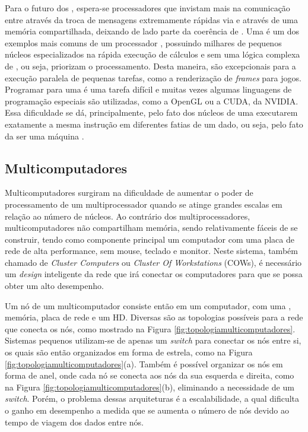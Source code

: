 Para o futuro dos \manycores, espera-se processadores que invistam mais  na comunicação entre \CPUs através da troca de mensagens extremamente rápidas via \hardware e através de uma memória compartilhada, deixando de lado parte da coerência de \cache. Uma \GPU é um dos exemplos mais comuns de um processador \manycore, possuindo milhares de pequenos núcleos especializados na rápida execução de cálculos e sem uma lógica complexa de \cache, ou seja, priorizam o processamento. Desta maneira, \GPUs são excepcionais para a execução paralela de pequenas tarefas, como a renderização de \textit{frames} para jogos. Programar para uma \GPU é uma tarefa difícil e muitas vezes algumas linguagens de programação especiais são utilizadas, como a OpenGL ou a CUDA, da NVIDIA. Essa dificuldade se dá, principalmente, pelo fato dos núcleos de uma \GPU executarem exatamente a mesma instrução em diferentes fatias de um dado, ou seja, pelo fato da \GPU ser uma máquina \textit{\SIMD}.

\subsection{Multicomputadores}
\label{sec:multicomputadores}

Multicomputadores surgiram na dificuldade de aumentar o poder de processamento de um multiprocessador quando se atinge grandes escalas em relação ao número de núcleos. Ao contrário dos multiprocessadores, multicomputadores não compartilham memória, sendo relativamente fáceis de se construir, tendo como componente principal um computador com uma placa de rede de alta performance, sem mouse, teclado e monitor. Neste sistema, também chamado de \textit{Cluster Computers} ou \textit{Cluster Of Workstations} (COWs), é necessário um \textit{design} inteligente da rede que irá conectar os computadores para que se possa obter um alto desempenho.

Um nó de um multicomputador consiste então em um computador, com uma \CPU, memória, placa de rede e um HD. Diversas são as topologias possíveis para a rede que conecta os nós, como mostrado na Figura \ref{fig:topologiamulticomputadores}. Sistemas pequenos utilizam-se de apenas um \textit{switch} para conectar os nós entre si, os quais são então organizados em forma de estrela, como na Figura \ref{fig:topologiamulticomputadores}(a). Também é possível organizar os nós em forma de anel, onde cada nó se conecta aos nós da sua esquerda e direita, como na Figura \ref{fig:topologiamulticomputadores}(b), eliminando a necessidade de um \textit{switch}. Porém, o problema dessas arquiteturas é a escalabilidade, a qual dificulta o ganho em desempenho a medida que se aumenta o número de nós devido ao tempo de viagem dos dados entre nós.

